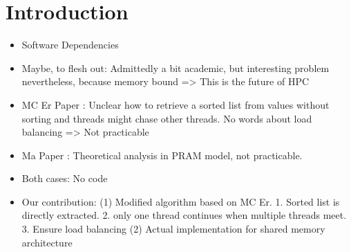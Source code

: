 \section{Introduction}\label{sec:intro}

\begin{invisible}
  \begin{itemize}
  \item Software Dependencies
  \item Maybe, to flesh out: Admittedly a bit academic, but interesting problem nevertheless, because memory bound => This is the future of HPC
  \end{itemize}
\end{invisible}


\begin{invisible}
  \begin{itemize}
  \item MC Er Paper \cite{er1983parallel}: Unclear how to retrieve a sorted list from values without sorting and threads might chase other threads. No words about load balancing => Not practicable
  \item Ma Paper \cite{ma1997efficient}: Theoretical analysis in PRAM model, not practicable.
  \item Both cases: No code
  \item Our contribution: (1) Modified algorithm based on MC Er. 1. Sorted list is directly extracted. 2. only one thread continues when multiple threads meet. 3. Ensure load balancing
                          (2) Actual implementation for shared memory architecture
  \end{itemize}
\end{invisible}


